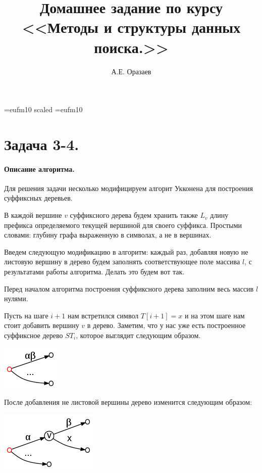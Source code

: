 \documentclass[12pt]{article}
\title{\bf Домашнее задание по курсу \\ <<Методы
и структуры данных поиска.>>}
\author{А.Е. Оразаев}
\date{}
\begin{document}
\voffset=-20mm
\hoffset=-12mm
\font\Got=eufm10 scaled \font\Got=eufm10

\maketitle

\section{Задача 3-4.}
\paragraph{Описание алгоритма.}
Для решения задачи несколько модифицируем алгорит Укконена для построения
суффиксных деревьев.

В каждой вершине $ v $ суффиксного дерева будем хранить также $ L_{v} $
длину префикса определяемого текущей вершиной для своего суффикса. Простыми
словами: глубину графа выраженную в символах, а не в вершинах.

Введем следующую модификацию в алгоритм: каждый раз, добавляя новую не
листовую вершину в дерево будем заполнять соответствующее поле массива
$ l $, с результатами работы алгоритма. Делать это будем вот так.

Перед началом алгоритма построения суффиксного дерева заполним весь массив
$ l $ нулями.

Пусть на шаге $ i + 1 $ нам встретился символ $ T[i + 1] = x $ и на
этом шаге нам стоит добавить вершину $ v $ в дерево. Заметим,
что у нас уже есть построенное суффиксное дерево $ ST_i $, которое выглядит
следующим образом.
\begin{center}
    \includegraphics[width=60bp]{before_addition.png}
\end{center}

После добавления не листовой вершины дерево изменится следующим образом:
\begin{center}
    \includegraphics[width=100bp]{after_addition.png}
\end{center}
\end{document}
